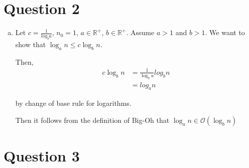 \documentclass[12pt]{article}
\begin{document}
\section*{Question 2}
\begin{enumerate}[a.]
    \item

    Let $c = \frac{1}{log_b a}$, $n_0 = 1$, $a \in \mathbb{R}^{+}$, $b \in \mathbb{R}^{+}$.
    Assume $a > 1$ and $b > 1$. We want to show that $\log_a n \leq c \log_b n$.

    \bigskip

    Then,
    \setcounter{equation}{0}
    \begin{align}
        c \log_b n &= \frac{1}{\log_b a} log_b n\\
        &= log_a n
    \end{align}

    by change of base rule for logarithms.

    \bigskip

    Then it follows from the definition of Big-Oh that $\log_a n \in \mathcal{O}(\log_b n)$

\end{enumerate}

\section*{Question 3}
\end{document}
